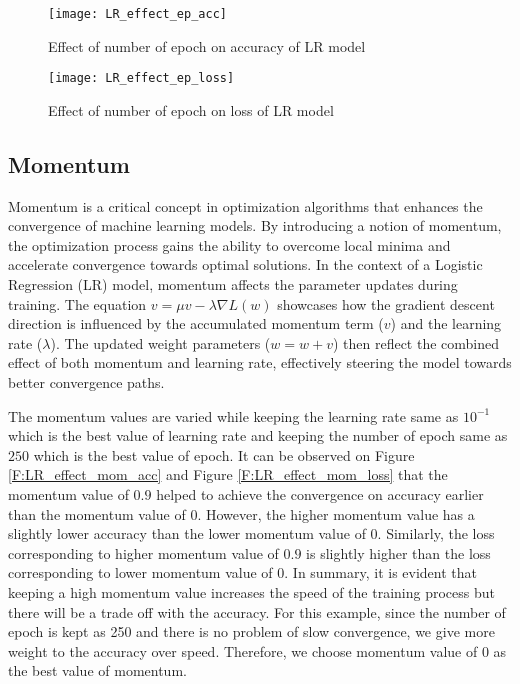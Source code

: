 \documentclass[12pt, a4paper, twoside]{article}
\begin{document}
\begin{figure}[h!]
	\centering
	\texttt{[image: LR\_effect\_ep\_acc]}
	\caption{Effect of number of epoch on  accuracy of LR model}
	\label{F:LR_effect_ep_acc}
\end{figure}
\begin{figure}[h!]
	\centering
	\texttt{[image: LR\_effect\_ep\_loss]}
	\caption{Effect of number of epoch on loss of LR model}
	\label{F:LR_effect_ep_loss}
\end{figure}

\subsection{Momentum}\label{SS:lr-mom}
Momentum is a critical concept in optimization algorithms that enhances the convergence of machine learning models. By introducing a notion of momentum, the optimization process gains the ability to overcome local minima and accelerate convergence towards optimal solutions. In the context of a Logistic Regression (LR) model, momentum affects the parameter updates during training. The equation $v = \mu v - \lambda \nabla L(w)$ showcases how the gradient descent direction is influenced by the accumulated momentum term ($v$) and the learning rate ($\lambda$). The updated weight parameters ($w = w + v$) then reflect the combined effect of both momentum and learning rate, effectively steering the model towards better convergence paths.
\par
The momentum values are varied while keeping the learning rate same as $10^{-1}$ which is the best value of learning rate and keeping the number of epoch same as $250$ which is the best value of epoch. It can be observed on Figure \ref{F:LR_effect_mom_acc} and Figure \ref{F:LR_effect_mom_loss} that the momentum value of $0.9$ helped to achieve the convergence on accuracy earlier than the momentum value of 0. However, the higher momentum value has a slightly lower accuracy than the lower momentum value of 0. Similarly, the loss corresponding to higher momentum value of $0.9$ is slightly higher than the loss corresponding to lower momentum value of 0. In summary, it is evident that keeping a high momentum value increases the speed of the training process but there will be a trade off with the accuracy. For this example, since the number of epoch is kept as 250 and there is no problem of slow convergence, we give more weight to the accuracy over speed. Therefore, we choose momentum value of 0 as the best value of momentum.
\end{document}
